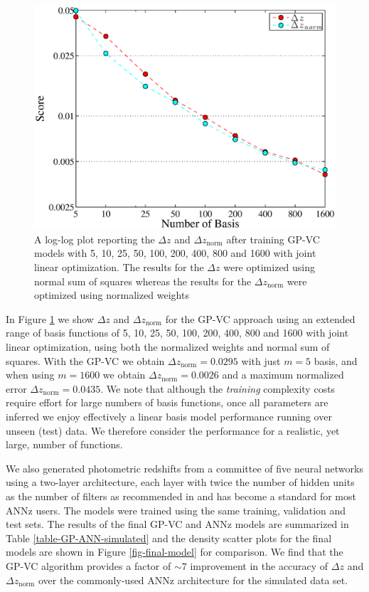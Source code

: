 \documentclass[useAMS,usenatbib,fleqn]{mn2e}
\begin{document}
\begin{figure}
       \centering
       \includegraphics[width=\columnwidth]{figures/1600.eps}
        \caption{A log-log plot reporting the $\Delta z$ and $\Delta z_\textrm{norm}$ after training GP-VC models with 5, 10, 25, 50, 100, 200, 400, 800 and 1600 with joint linear optimization. The results for the $\Delta z$ were optimized using normal sum of squares whereas the results for the $\Delta z_\textrm{norm}$ were optimized using normalized weights}
       \label{fig-1600}
\end{figure}

In Figure \ref{fig-1600} we show $\Delta z$ and $\Delta z_\textrm{norm}$ for the GP-VC approach using an extended range of basis functions of 5, 10, 25, 50, 100, 200, 400, 800 and 1600 with joint linear optimization, using both the normalized weights and normal sum of squares. With the GP-VC we obtain $\Delta z_\textrm{norm} = 0.0295$ with just $m=5$ basis, and when using $m=1600$ we obtain $\Delta z_\textrm{norm} = 0.0026$ and  a maximum normalized error $\Delta z_\textrm{norm} = 0.0435$. We note that although the \emph{training} complexity costs require effort for large numbers of basis functions, once all parameters are inferred we enjoy effectively a linear basis model performance running over unseen (test) data. We therefore consider the performance for a realistic, yet large, number of functions. 

We also generated photometric redshifts from a committee of five neural networks using a two-layer architecture, each layer with twice the number of hidden units as the number of filters as recommended in \cite{Collister04} and has become a standard for most {\sc ANNz} users. The models were trained using the same training, validation and test sets. The results of the final GP-VC and {\sc ANNz} models are summarized in Table \ref{table-GP-ANN-simulated} and the density scatter plots for the final models are shown in Figure \ref{fig-final-model} for comparison. We find that the GP-VC algorithm provides a factor of $\sim 7$ improvement in the accuracy of $\Delta z$ and $\Delta z_\textrm{norm}$ over the commonly-used {\sc ANNz} architecture for the simulated data set.
\end{document}

